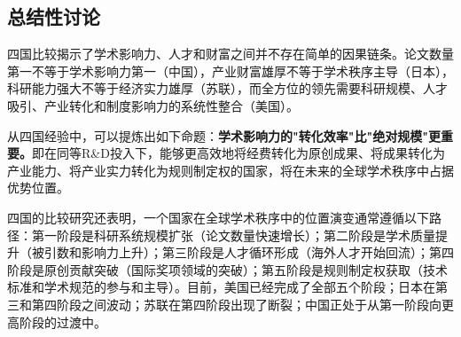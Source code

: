 \subsection{总结性讨论}

四国比较揭示了学术影响力、人才和财富之间并不存在简单的因果链条。论文数量第一不等于学术影响力第一（中国），产业财富雄厚不等于学术秩序主导（日本），科研能力强大不等于经济实力雄厚（苏联），而全方位的领先需要科研规模、人才吸引、产业转化和制度影响力的系统性整合（美国）。

从四国经验中，可以提炼出如下命题：\textbf{学术影响力的"转化效率"比"绝对规模"更重要。}即在同等R\&D投入下，能够更高效地将经费转化为原创成果、将成果转化为产业能力、将产业实力转化为规则制定权的国家，将在未来的全球学术秩序中占据优势位置。

四国的比较研究还表明，一个国家在全球学术秩序中的位置演变通常遵循以下路径：第一阶段是科研系统规模扩张（论文数量快速增长）；第二阶段是学术质量提升（被引数和影响力上升）；第三阶段是人才循环形成（海外人才开始回流）；第四阶段是原创贡献突破（国际奖项领域的突破）；第五阶段是规则制定权获取（技术标准和学术规范的参与和主导）。目前，美国已经完成了全部五个阶段；日本在第三和第四阶段之间波动；苏联在第四阶段出现了断裂；中国正处于从第一阶段向更高阶段的过渡中。
